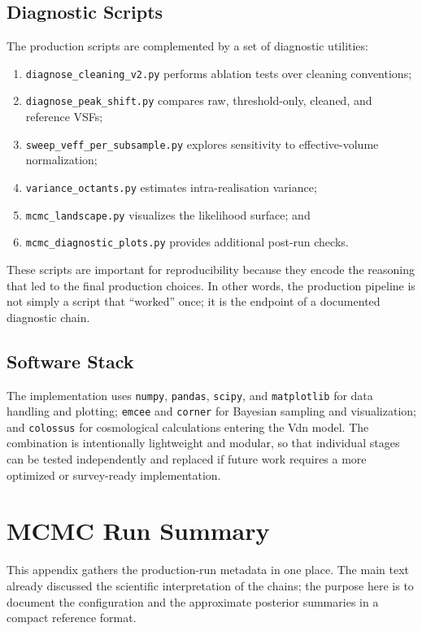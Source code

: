 \documentclass[12pt]{report}
\begin{document}
\section{Diagnostic Scripts}

The production scripts are complemented by a set of diagnostic utilities:
\begin{enumerate}
    \item \texttt{diagnose\_cleaning\_v2.py} performs ablation tests over cleaning conventions;
    \item \texttt{diagnose\_peak\_shift.py} compares raw, threshold-only, cleaned, and reference VSFs;
    \item \texttt{sweep\_veff\_per\_subsample.py} explores sensitivity to effective-volume normalization;
    \item \texttt{variance\_octants.py} estimates intra-realisation variance;
    \item \texttt{mcmc\_landscape.py} visualizes the likelihood surface; and
    \item \texttt{mcmc\_diagnostic\_plots.py} provides additional post-run checks.
\end{enumerate}

These scripts are important for reproducibility because they encode the reasoning that led to the final production choices. In other words, the production pipeline is not simply a script that ``worked'' once; it is the endpoint of a documented diagnostic chain.

\section{Software Stack}

The implementation uses \texttt{numpy}, \texttt{pandas}, \texttt{scipy}, and \texttt{matplotlib} for data handling and plotting; \texttt{emcee} and \texttt{corner} for Bayesian sampling and visualization; and \texttt{colossus} for cosmological calculations entering the Vdn model. The combination is intentionally lightweight and modular, so that individual stages can be tested independently and replaced if future work requires a more optimized or survey-ready implementation.


\chapter{MCMC Run Summary}
\label{app:mcmc_summary}

This appendix gathers the production-run metadata in one place. The main text already discussed the scientific interpretation of the chains; the purpose here is to document the configuration and the approximate posterior summaries in a compact reference format.
\end{document}
